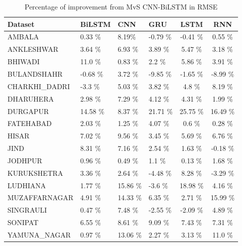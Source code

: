 \documentclass[a4paper,fleqn]{cas-dc}
\begin{document}
  \begin{table}[]
    \caption{Percentage of improvement from MvS CNN-BiLSTM in RMSE}
    \label{RMSE imp}
    \begin{tabular}{llllcc}
    \hline    Dataset        &   BiLSTM &   CNN &   GRU &   LSTM &   RNN \\ \hline
    AMBALA         & 0.33 \%           & 8.19\%         & -0.79 \%       & -0.41 \%         & 0.55 \%            \\
    ANKLESHWAR     & 3.64  \%            & 6.93 \%        & 3.89 \%        & 5.47 \%         & 3.18 \%              \\
    BHIWADI       & 11.0  \%            & 0.83 \%         & 2.2 \%         & 5.86  \%        & 3.91 \%            \\
    BULANDSHAHR    & -0.68  \%            & 3.72 \%         & -9.85 \%       & -1.65  \%       & -8.99 \%               \\
    CHARKHI\_DADRI & -3.3 \%            & 5.03 \%        & 3.82 \%        & 4.8   \%        & 8.19   \%              \\
    DHARUHERA      & 2.98 \%            & 7.29 \%        & 4.12 \%        & 4.31 \%         & 1.99     \%             \\
    DURGAPUR       & 14.58 \%          & 8.37 \%         & 21.71 \%       & 25.75  \%       & 16.49  \%                \\
    FATEHABAD    & 2.03 \%           & 1.25 \%        & 4.07 \%        & 0.6    \%       & 0.28  \%                   \\
    HISAR          & 7.02 \%           & 9.56 \%        & 3.45 \%        & 5.69  \%        & 6.76  \%                   \\
    JIND           & 8.31 \%           & 7.16 \%        & 2.54 \%        & 1.63 \%         & -0.18 \%                    \\
    JODHPUR        & 0.96 \%           & 0.49 \%         & 1.1 \%         & 0.13 \%          & 1.68 \%                     \\
    KURUKSHETRA    & 3.36 \%           & 2.64 \%        & -4.48  \%      & 8.28 \%         & -3.29  \%                 \\
    LUDHIANA      & 1.77 \%           & 15.86 \%       & -3.6  \%       & 18.98 \%      & 4.16   \%                  \\
    MUZAFFARNAGAR  & 4.91 \%           & 14.33 \%       & 6.35 \%         & 2.71 \%         & 15.99 \%                    \\
    SINGRAULI      & 0.47 \%           & 7.48 \%        & -2.55 \%       & -2.09 \%        & 4.89  \%                   \\
    SONIPAT        & 6.55 \%           & 8.61 \%        & 9.09 \%        & 7.43 \%         & 7.31  \%                    \\
    YAMUNA\_NAGAR  & 0.97 \%           & 13.06 \%       & 2.27 \%        & 3.13 \%         & 11.0  \%                   \\ \hline
    \end{tabular}
    \end{table}
\end{document}
